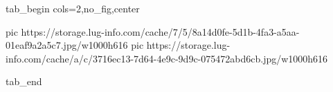  
 
 
 
 


\ifcmt
  tab_begin cols=2,no_fig,center

     pic https://storage.lug-info.com/cache/7/5/8a14d0fe-5d1b-4fa3-a5aa-01eaf9a2a5c7.jpg/w1000h616%
     pic https://storage.lug-info.com/cache/a/c/3716ec13-7d64-4e9c-9d9c-075472abd6cb.jpg/w1000h616%

  tab_end
\fi
